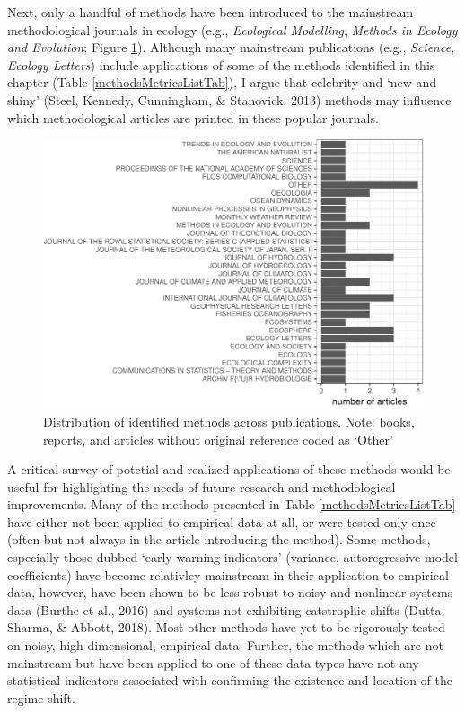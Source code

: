 \documentclass[12pt,twoside,openany]{reedthesis}
\begin{document}
Next, only a handful of methods have been introduced to the mainstream
methodological journals in ecology (e.g., \emph{Ecological Modelling},
\emph{Methods in Ecology and Evolution}; Figure \ref{fig:jrnlDistFig}).
Although many mainstream publications (e.g., \emph{Science},
\emph{Ecology Letters}) include applications of some of the methods
identified in this chapter (Table \ref{methodsMetricsListTab}), I argue
that celebrity and `new and shiny' (Steel, Kennedy, Cunningham, \&
Stanovick, 2013) methods may influence which methodological articles are
printed in these popular journals.
\begin{figure}
\centering
\includegraphics{_myDissertation_files/figure-latex/jrnlDistFig-1.pdf}
\caption{\label{fig:jrnlDistFig}Distribution of identified methods across
publications. Note: books, reports, and articles without original
reference coded as `Other'}
\end{figure}
A critical survey of potetial and realized applications of these methods
would be useful for highlighting the needs of future research and
methodological improvements. Many of the methods presented in Table
\ref{methodsMetricsListTab} have either not been applied to empirical
data at all, or were tested only once (often but not always in the
article introducing the method). Some methods, especially those dubbed
`early warning indicators' (variance, autoregressive model coefficients)
have become relativley mainstream in their application to empirical
data, however, have been shown to be less robust to noisy and nonlinear
systems data (Burthe et al., 2016) and systems not exhibiting
catstrophic shifts (Dutta, Sharma, \& Abbott, 2018). Most other methods
have yet to be rigorously tested on noisy, high dimensional, empirical
data. Further, the methods which are not mainstream but have been
applied to one of these data types have not any statistical indicators
associated with confirming the existence and location of the regime
shift.
\end{document}
